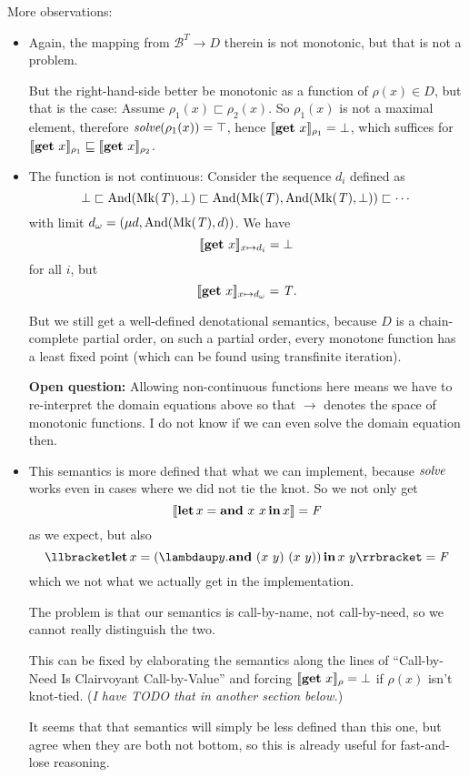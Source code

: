 \documentclass[manuscript,screen,acmsmall,nonacm]{acmart}
\begin{document}
More observations:
\begin{itemize}
\item Again, the mapping from $\mathcal B^T \to D$ therein is not monotonic, but that is not a problem.

But the right-hand-side better be monotonic as a function of $\rho(x) \in D$, but that is the case:
Assume
$\rho_1(x) \sqsubset \rho_2(x)$.
So $\rho_1(x)$ is not a maximal element, therefore $\operatorname{\textit{solve}}(\rho_1(x)) = \top$, hence $\llbracket \mathbf{get}~x \rrbracket_{\rho_1} = \bot$, which suffices for
$\llbracket \mathbf{get}~x \rrbracket_{\rho_1} \sqsubseteq \llbracket \mathbf{get}~x \rrbracket_{\rho_2}$.

\item The function is not continuous: Consider the sequence $d_i$ defined as
\[
\bot
\sqsubset \operatorname{And}(\operatorname{Mk}(\mathit T), \bot)
\sqsubset \operatorname{And}(\operatorname{Mk}(\mathit T), \operatorname{And}(\operatorname{Mk}(\mathit T), \bot))
\sqsubset \cdots
\]
with limit $d_\omega = (\mu d, \operatorname{And}(\operatorname{Mk}(\mathit T), d))$. We have
\[
\llbracket \mathbf{get}~x \rrbracket_{x \mapsto d_i} = \bot
\]
for all $i$, but
\[
\llbracket \mathbf{get}~x \rrbracket_{x \mapsto d_\omega} = \mathit T.
\]

But we still get a well-defined denotational semantics, because $D$ is a chain-complete partial order, on such a partial order, every monotone function has a least fixed point (which can be found using transfinite iteration).

\textbf{Open question:} Allowing non-continuous functions here means we have to re-interpret the domain equations above so that $\to$ denotes the space of monotonic functions. I do not know if we can even solve the domain equation then.

\item This semantics is more defined that what we can implement, because $\operatorname{\textit{solve}}$ works even in cases where we did not tie the knot. So we not only get
\[
\llbracket \mathbf{let}\,x=\mathbf{and}~x~x\,\mathbf{in}\,x \rrbracket = \mathit F
\]
as we expect, but also
\[
\D{\sLet{x}{(\slambda y. \sAnd~(x~y) ~(x~y))}{x~y}} = \dFalse
\]
which we not what we actually get in the implementation.

The problem is that our semantics is call-by-name, not call-by-need, so we cannot really distinguish the two.

This can be fixed by elaborating the semantics along the lines of “Call-by-Need Is Clairvoyant Call-by-Value” and forcing  $\llbracket \mathbf{get}~x \rrbracket_\rho = \bot$ if $\rho(x)$ isn't knot-tied.
(\emph{I have TODO that in another section below.})

It seems that that semantics will simply be less defined than this one, but agree when they are both not bottom, so this is already useful for fast-and-lose reasoning.

\end{itemize}
\end{document}
